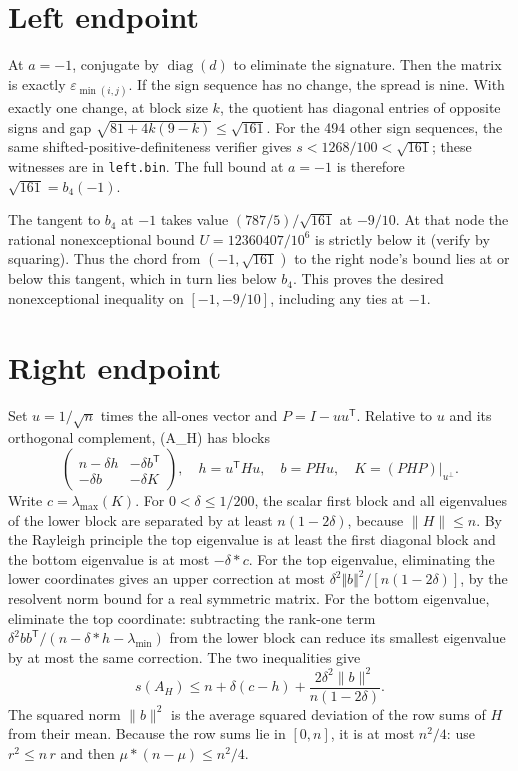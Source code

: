 \documentclass[11pt]{article}
\begin{document}
\section{Left endpoint}\label{left-endpoint}

At \(a=-1\), conjugate by \(\operatorname{diag}(d)\) to eliminate the signature. Then the matrix is exactly \(\varepsilon_{\min(i,j)}\). If the sign sequence has no change, the spread is nine. With exactly one change, at block size \(k\), the quotient has diagonal entries of opposite signs and gap \(\sqrt{81+4k(9-k)}\le \sqrt{161}\). For the 494 other sign sequences, the same shifted-positive-definiteness verifier gives \(s<1268/100<\sqrt{161}\); these witnesses are in \texttt{left.bin}. The full bound at \(a=-1\) is therefore \(\sqrt{161}=b_4(-1)\).

The tangent to \(b_4\) at \(-1\) takes value \((787/5)/\sqrt{161}\) at \(-9/10\). At that node the rational nonexceptional bound \(U=12360407/10^6\) is strictly below it (verify by squaring). Thus the chord from \((-1,\sqrt{161})\) to the right node's bound lies at or below this tangent, which in turn lies below \(b_4\). This proves the desired nonexceptional inequality on \([-1,-9/10]\), including any ties at \(-1\).

\section{Right endpoint}\label{right-endpoint}

Set \(u=1/\sqrt{n}\) times the all-ones vector and \(P=I-uu^{\mathsf T}\). Relative to \(u\) and its orthogonal complement, (A\_H) has blocks
\[
\begin{pmatrix}n-\delta h&-\delta b^{\mathsf T}\\-\delta b&-\delta K\end{pmatrix},\quad h=u^{\mathsf T}Hu,\quad b=PHu,\quad K=(PHP)|_{u^\perp}.
\]
Write \(c=\lambda_{\max}(K)\). For \(0<\delta \le 1/200\), the scalar first block and all eigenvalues of the lower block are separated by at least \(n(1-2\delta )\), because \(\lVert H\rVert\le n\). By the Rayleigh principle the top eigenvalue is at least the first diagonal block and the bottom eigenvalue is at most \(-\delta *c\). For the top eigenvalue, eliminating the lower coordinates gives an upper correction at most \(\delta ^2\Vert b\Vert ^2/[n(1-2\delta )]\), by the resolvent norm bound for a real symmetric matrix. For the bottom eigenvalue, eliminate the top coordinate: subtracting the rank-one term \(\delta ^2 bb^{\mathsf T}/(n-\delta *h-\lambda_{\min})\) from the lower block can reduce its smallest eigenvalue by at most the same correction. The two inequalities give
\[
s(A_H)\le n+\delta(c-h)+\frac{2\delta^2\lVert b\rVert^2}{n(1-2\delta)}.
\]
The squared norm \(\lVert b\rVert^2\) is the average squared deviation of the row sums of \(H\) from their mean. Because the row sums lie in \([0,n]\), it is at most \(n^2/4\): use \(r^2\le n\,r\) and then \(\mu *(n-\mu )\le n^2/4\).
\end{document}
